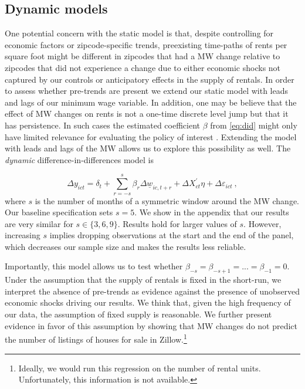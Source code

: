 \subsection{Dynamic models}

One potential concern with the static model is that, despite controlling for economic 
factors or zipcode-specific trends, preexisting time-paths of rents per square foot might 
be different in zipcodes that had a MW change relative to zipcodes that did not experience 
a change due to either economic shocks not captured by our controls or anticipatory effects 
in the supply of rentals. In order to assess whether pre-trends are present we extend our 
static model with leads and lags of our minimum wage variable. In addition, one may be 
believe that the effect of MW changes on rents is not a one-time discrete level jump but 
that it has persistence. In such cases the estimated coefficient $\beta$ from \autoref{eq:did} 
might only have limited relevance for evaluating the policy of interest 
\parencite{callaway2019}. Extending the model with leads and lags of the MW allows us to 
explore this possibility as well. The \textit{dynamic} difference-in-differences model is

\begin{equation} \label{eq:leads_lags}
	\Delta y_{ict} = \delta_t
				  + \sum_{r=-s}^{s} \beta_r \Delta \underline{w}_{ic,t+r}
    			  +  \Delta X^{'}_{ct}\eta
    			  + \Delta \varepsilon_{ict} \ ,
\end{equation}
where $s$ is the number of months of a symmetric window around the MW change. Our baseline
specification sets $s = 5$. We show in the appendix that our results are very similar for
$s \in \{3, 6, 9\}$. Results hold for larger values of $s$. However, increasing $s$ implies dropping observations at the start and the end of the panel, which decreases our sample size and makes the results less reliable.

Importantly, this model allows us to test whether $\beta_{-s} = \beta_{-s+1} = ... 
= \beta_{-1} = 0$. Under the assumption that the supply of rentals is fixed in the short-run, 
we interpret the absence of pre-trends as evidence against the presence of unobserved economic 
shocks driving our results. We think that, given the high frequency of our data, the 
assumption of fixed supply is reasonable. We further present evidence in favor of this 
assumption by showing that MW changes do not predict the number of listings of houses for sale 
in Zillow.\footnote{Ideally, we would run this regression on the number of rental units. 
	Unfortunately, this information is not available.}

